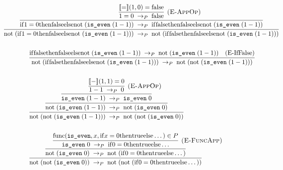 \begin{align*}
  & \hspace{-4em} \infer {
    \Reduce{P}
      {\App{\mathrm{not}}{\paren{\If{1 = 0}{\false}{\App{\mathrm{not}}{\paren{\App{\code{is\_even}}{\paren{1-1}}}}}}}}
      {\App{\mathrm{not}}{\paren{\If{\false}{\false}{\App{\mathrm{not}}{\paren{\App{\code{is\_even}}{\paren{1-1}}}}}}}}
  } {
    \infer {
      \Reduce{P}
        {\If{1 = 0}{\false}{\App{\mathrm{not}}{\paren{\App{\code{is\_even}}{\paren{1-1}}}}}}
        {\If{\false}{\false}{\App{\mathrm{not}}{\paren{\App{\code{is\_even}}{\paren{1-1}}}}}}
    } {
      \infer[\ERuleAppOp] {
        \Reduce{P}{1 = 0}{\false}
      } {
        \sem{=}\paren{1, 0} = \false
      }
    }
  } \\\\
  & \infer {
    \Reduce{P}
      {\App{\mathrm{not}}{\paren{\If{\false}{\false}{\App{\mathrm{not}}{\paren{\App{\code{is\_even}}{\paren{1-1}}}}}}}}
      {\App{\mathrm{not}}{\paren{\App{\mathrm{not}}{\paren{\App{\code{is\_even}}{\paren{1-1}}}}}}}
  } {
    \Reduce{P}
      {\If{\false}{\false}{\App{\mathrm{not}}{\paren{\App{\code{is\_even}}{\paren{1-1}}}}}}
      {\App{\mathrm{not}}{\paren{\App{\code{is\_even}}{\paren{1-1}}}}}
      \quad \ERuleIfFalse
  } \\\\
  & \infer {
    \Reduce{P}
      {\App{\mathrm{not}}{\paren{\App{\mathrm{not}}{\paren{\App{\code{is\_even}}{\paren{1-1}}}}}}}
      {\App{\mathrm{not}}{\paren{\App{\mathrm{not}}{\paren{\App{\code{is\_even}}{0}}}}}}
  } {
    \infer {
      \Reduce{P}
        {\App{\mathrm{not}}{\paren{\App{\code{is\_even}}{\paren{1-1}}}}}
        {\App{\mathrm{not}}{\paren{\App{\code{is\_even}}{0}}}}
    } {
      \infer {
        \Reduce{P}
          {\App{\code{is\_even}}{\paren{1-1}}}
          {\App{\code{is\_even}}{0}}
      } {
        \infer[\ERuleAppOp] {
          \Reduce{P}{1-1}{0}
        } {
          \sem{-}\paren{1, 1} = 0
        }
      }
    }
  }  \\\\
  & \infer {
    \Reduce{P}
      {\App{\mathrm{not}}{\paren{\App{\mathrm{not}}{\paren{\App{\code{is\_even}}{0}}}}}}
      {\App{\mathrm{not}}{\paren{\App{\mathrm{not}}{\paren
        {\If{0 = 0}{\true}{\dots}}
      }}}}
  } {
    \infer {
      \Reduce{P}
        {\App{\mathrm{not}}{\paren{\App{\code{is\_even}}{0}}}}
        {\App{\mathrm{not}}{\paren
          {\If{0 = 0}{\true}{\dots}}
        }}
    } {
      \infer[\ERuleAppFunc] {
        \Reduce{P}
          {\App{\code{is\_even}}{0}}
          {\If{0 = 0}{\true}{\dots}}
      } {
        \Func{\code{is\_even}}{x}{\If{x = 0}{\true}{\dots}} \in P
}}}
\end{align*}
